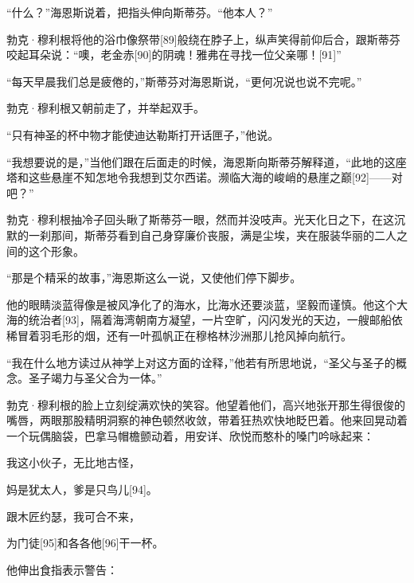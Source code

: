 \documentclass{article}
\begin{document}
“什么？”海恩斯说着，把指头伸向斯蒂芬。“他本人？”



勃克·穆利根将他的浴巾像祭带[89]般绕在脖子上，纵声笑得前仰后合，跟斯蒂芬咬起耳朵说：“噢，老金赤[90]的阴魂！雅弗在寻找一位父亲哪！[91]”



“每天早晨我们总是疲倦的，”斯蒂芬对海恩斯说，“更何况说也说不完呢。”



勃克·穆利根又朝前走了，并举起双手。



“只有神圣的杯中物才能使迪达勒斯打开话匣子，”他说。



“我想要说的是，”当他们跟在后面走的时候，海恩斯向斯蒂芬解释道，“此地的这座塔和这些悬崖不知怎地令我想到艾尔西诺。濒临大海的峻峭的悬崖之巅[92]——对吧？”



勃克·穆利根抽冷子回头瞅了斯蒂芬一眼，然而并没吱声。光天化日之下，在这沉默的一刹那间，斯蒂芬看到自己身穿廉价丧服，满是尘埃，夹在服装华丽的二人之间的这个形象。



“那是个精采的故事，”海恩斯这么一说，又使他们停下脚步。



他的眼睛淡蓝得像是被风净化了的海水，比海水还要淡蓝，坚毅而谨慎。他这个大海的统治者[93]，隔着海湾朝南方凝望，一片空旷，闪闪发光的天边，一艘邮船依稀冒着羽毛形的烟，还有一叶孤帆正在穆格林沙洲那儿抢风掉向航行。



“我在什么地方读过从神学上对这方面的诠释，”他若有所思地说，“圣父与圣子的概念。圣子竭力与圣父合为一体。”



勃克·穆利根的脸上立刻绽满欢快的笑容。他望着他们，高兴地张开那生得很俊的嘴唇，两眼那股精明洞察的神色顿然收敛，带着狂热欢快地眨巴着。他来回晃动着一个玩偶脑袋，巴拿马帽檐颤动着，用安详、欣悦而憨朴的嗓门吟咏起来：



我这小伙子，无比地古怪，



妈是犹太人，爹是只鸟儿[94]。



跟木匠约瑟，我可合不来，



为门徒[95]和各各他[96]干一杯。



他伸出食指表示警告：
\end{document}
